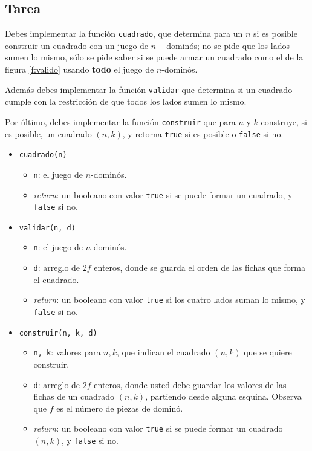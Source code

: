 \documentclass{oci}
\begin{document}
\subsection*{Tarea}

Debes implementar la función \verb+cuadrado+, que determina para un $n$ si es posible construir un cuadrado con un juego de $n-$dominós; no se pide que los lados sumen lo mismo, sólo se pide saber si se puede armar un cuadrado como el de la figura \ref{f:valido} usando \textbf{todo} el juego de $n$-dominós.

Además debes implementar la función \verb+validar+ que determina si un cuadrado cumple con la restricción de que todos los lados sumen lo mismo.

Por último, debes implementar la función \verb+construir+ que para $n$ y $k$ construye, si es posible, un cuadrado $(n,k)$, y retorna \verb+true+ si es posible o \verb+false+ si no.

\begin{itemize}
 \item \verb+cuadrado(n)+
 \begin{itemize}
  \item \verb+n+: el juego de $n$-dominós.
  \item \emph{return}: un booleano con valor \verb+true+ si se puede formar un cuadrado, y \verb+false+ si no.
 \end{itemize}
 \item \verb+validar(n, d)+
 \begin{itemize}
  \item \verb+n+: el juego de $n$-dominós.
  \item \verb+d+: arreglo de $2f$ enteros, donde se guarda el orden de las fichas que forma el cuadrado.
  \item \emph{return}: un booleano con valor \verb+true+ si los cuatro lados suman lo mismo, y \verb+false+ si no.
 \end{itemize}

 \item \verb+construir(n, k, d)+
 \begin{itemize}
  \item \verb+n, k+: valores para $n,k$, que indican el cuadrado $(n,k)$ que se quiere construir.
  \item \verb+d+: arreglo de $2f$ enteros, donde usted debe guardar los valores de las fichas de un cuadrado $(n,k)$, partiendo desde alguna esquina. Observa que $f$ es el número de piezas de dominó.
  \item \emph{return}: un booleano con valor \verb+true+ si se puede formar un cuadrado $(n,k)$, y \verb+false+ si no.
 \end{itemize}
\end{itemize}
\end{document}
